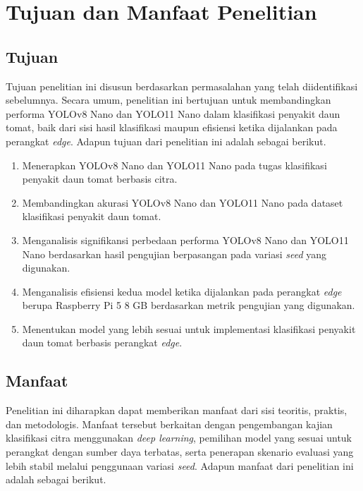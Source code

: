 \section{Tujuan dan Manfaat Penelitian}
\begin{sectioncontent}
    \subsection{Tujuan}
    \begin{subsectioncontent}
        \hspace{\parindent}Tujuan penelitian ini disusun berdasarkan permasalahan yang telah diidentifikasi sebelumnya. Secara umum, penelitian ini bertujuan untuk membandingkan performa YOLOv8 Nano dan YOLO11 Nano dalam klasifikasi penyakit daun tomat, baik dari sisi hasil klasifikasi maupun efisiensi ketika dijalankan pada perangkat \textit{edge}. Adapun tujuan dari penelitian ini adalah sebagai berikut.

        \begin{enumerate}[leftmargin=0.75cm,label=\arabic*.]
            \item Menerapkan YOLOv8 Nano dan YOLO11 Nano pada tugas klasifikasi penyakit daun tomat berbasis citra.
            \item Membandingkan akurasi YOLOv8 Nano dan YOLO11 Nano pada dataset klasifikasi penyakit daun tomat.
            \item Menganalisis signifikansi perbedaan performa YOLOv8 Nano dan YOLO11 Nano berdasarkan hasil pengujian berpasangan pada variasi \textit{seed} yang digunakan.
            \item Menganalisis efisiensi kedua model ketika dijalankan pada perangkat \textit{edge} berupa Raspberry Pi 5 8 GB berdasarkan metrik pengujian yang digunakan.
            \item Menentukan model yang lebih sesuai untuk implementasi klasifikasi penyakit daun tomat berbasis perangkat \textit{edge}.
        \end{enumerate}
    \end{subsectioncontent}

    \subsection{Manfaat}
    \begin{subsectioncontent}
        \hspace{\parindent}Penelitian ini diharapkan dapat memberikan manfaat dari sisi teoritis, praktis, dan metodologis. Manfaat tersebut berkaitan dengan pengembangan kajian klasifikasi citra menggunakan \textit{deep learning}, pemilihan model yang sesuai untuk perangkat dengan sumber daya terbatas, serta penerapan skenario evaluasi yang lebih stabil melalui penggunaan variasi \textit{seed}. Adapun manfaat dari penelitian ini adalah sebagai berikut.


\end{subsectioncontent}
\end{sectioncontent}

